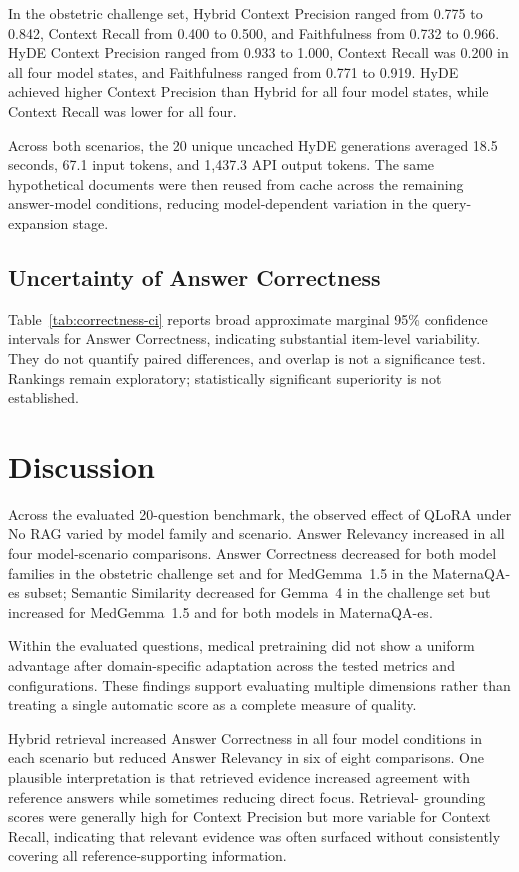 In the obstetric challenge set, Hybrid Context Precision ranged from 0.775
to 0.842, Context Recall from 0.400 to 0.500, and Faithfulness from 0.732
to 0.966. HyDE Context Precision ranged from 0.933 to 1.000, Context Recall
was 0.200 in all four model states, and Faithfulness ranged from 0.771 to
0.919. HyDE achieved higher Context Precision than Hybrid for all four model
states, while Context Recall was lower for all four.

Across both scenarios, the 20 unique uncached HyDE generations averaged
18.5 seconds, 67.1 input tokens, and 1,437.3 API output tokens. The same
hypothetical documents were then reused from cache across the remaining
answer-model conditions, reducing model-dependent variation in the
query-expansion stage.

\subsection{Uncertainty of Answer Correctness}
Table~\ref{tab:correctness-ci} reports broad approximate marginal 95\%
confidence intervals for Answer Correctness, indicating substantial
item-level variability. They do not quantify paired differences, and overlap
is not a significance test. Rankings remain exploratory; statistically
significant superiority is not established.

\section{Discussion}
Across the evaluated 20-question benchmark, the observed effect of QLoRA
under No RAG varied by model family and scenario. Answer Relevancy increased
in all four model-scenario comparisons. Answer Correctness decreased for both
model families in the obstetric challenge set and for MedGemma~1.5 in the
MaternaQA-es subset; Semantic Similarity decreased for Gemma~4 in the challenge
set but increased for MedGemma~1.5 and for both models in MaternaQA-es.

Within the evaluated questions, medical pretraining did not show a uniform
advantage after domain-specific adaptation across the tested metrics and
configurations. These findings support evaluating multiple
dimensions rather than treating a single automatic score as a complete
measure of quality.

Hybrid retrieval increased Answer Correctness in all four model conditions
in each scenario but reduced Answer Relevancy in six of eight comparisons.
One plausible interpretation is that retrieved evidence increased agreement
with reference answers while sometimes reducing direct focus. Retrieval-
grounding scores were generally high for Context Precision but more variable
for Context Recall, indicating that relevant evidence was often surfaced
without consistently covering all reference-supporting information.

